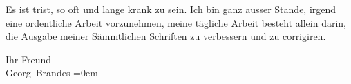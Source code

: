 \pstart
           Es ist trist, so oft und lange krank zu sein. Ich bin ganz ausser Stande, irgend eine
               ordentliche Arbeit vorzunehmen, meine tägliche Arbeit besteht allein darin, die
               Ausgabe meiner Sämmtlichen
                  Schriften zu verbessern und zu corrigiren.\pend
           
\pstart
           Ihr Freund{\\[\baselineskip]}\spacefill\mbox{Georg Brandes}\pend
           \leftskip=0em{}\endnumbering{}  
      